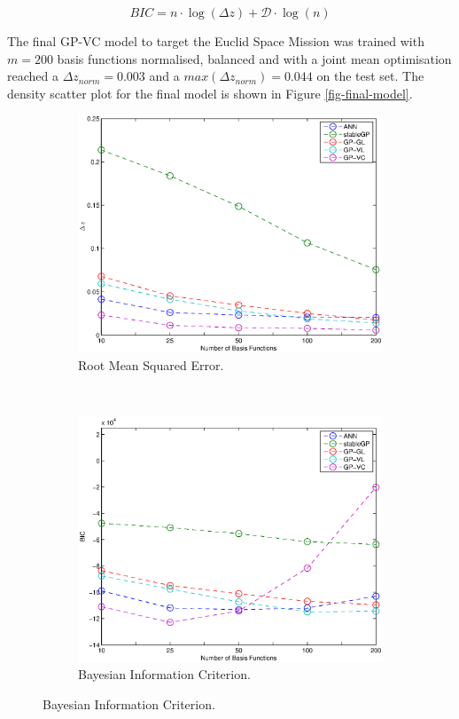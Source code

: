 \documentclass[useAMS,usenatbib,fleqn]{mn2e}
\begin{document}
\begin{equation}
\label{eq-bic}
BIC = n \cdot \log(\Delta z)+\mathcal{D}\cdot \log(n)
\end{equation}

The final GP-VC model to target the Euclid Space Mission was trained with $m=200$ basis functions normalised, balanced and with a joint mean optimisation reached a $\Delta z_{norm}=0.003$ and a  $max(\Delta z_{norm})=0.044$ on the test set. The density scatter plot for the final model is shown in Figure \ref{fig-final-model}.

\begin{figure}
        \centering
        
        \begin{subfigure}[b]{0.45\textwidth}
                \includegraphics[width=\textwidth]{figures/different-basis.eps}
                 \caption{Root Mean Squared Error.}
                 \label{fig-rmses}
        \end{subfigure}
	~
       \begin{subfigure}[b]{0.45\textwidth}
                \includegraphics[width=\textwidth]{figures/BIC.eps}
                 \caption{Bayesian Information Criterion.}
                 \label{fig-bic}
        \end{subfigure}


\end{figure}
\end{document}
